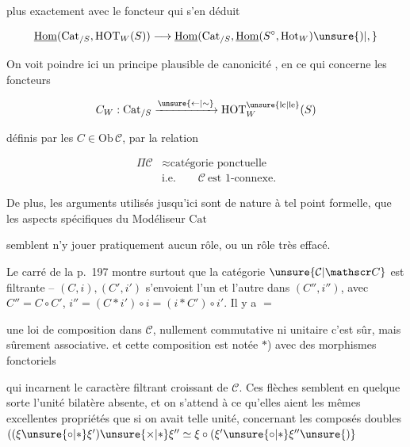 plus exactement avec le foncteur qui s'en déduit

\[
\underline{\mathrm{Hom}}(\mathrm{Cat}_{/S},\mathrm{HOT}_W(S))\longrightarrow\underline{\mathrm{Hom}}(\mathrm{Cat}_{/S},\underline{\mathrm{Hom}}(S^\circ,\mathrm{Hot}_W)\unsure{)|,}
\]

On voit poindre ici un principe plausible de canonicité , en ce qui concerne les foncteurs

\[
C_W:\mathrm{Cat}_{/S}\xrightarrow{\unsure{\leftarrow|\sim}}\mathrm{HOT}^{\unsure{\mathrm{lc}|\mathrm{le}}}_W(S)
\]

définis par les $C\in\mathrm{Ob}\,\mathcal C$, par la relation

\[
\begin{aligned}
\Pi\mathcal C&\approx\text{catégorie ponctuelle}\\
&\text{i.e.}\qquad\mathcal C\ \text{est }1\text{-connexe}.
\end{aligned}
\]

De plus, les arguments utilisés jusqu'ici sont de nature à tel point formelle, que les aspects spécifiques du Modéliseur $\mathrm{Cat}$

semblent n'y jouer pratiquement aucun rôle, ou un rôle très effacé.

Le carré de la p.~197 montre surtout que la catégorie $\unsure{\mathcal C|\mathscr C}$ est filtrante -- $(C,i),(C',i')$ s'envoient l'un et l'autre dans $(C'',i'')$, avec $C''=C\circ C'$,  $i''=(C*i')\circ i=(i*C')\circ i'$. Il y a $=$

une loi de composition dans $\mathcal C$, nullement commutative ni unitaire c'est sûr, mais sûrement associative. et \unsure{(} cette composition est notée $*$) avec des morphismes fonctoriels


qui incarnent le caractère filtrant croissant de $\mathcal C$. Ces flèches semblent  en quelque sorte l'unité bilatère absente, et on s'attend à ce qu'elles aient les mêmes excellentes propriétés que si on avait  telle unité, concernant les composés doubles $((\xi\unsure{\circ|*}\xi')\unsure{\times|*}\xi''\simeq\xi\circ(\xi'\unsure{\circ|*}\xi''\unsure{)}$ \unsure{:}
